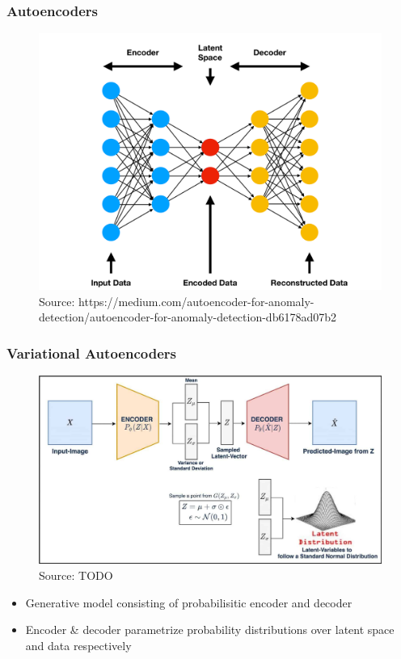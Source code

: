 \documentclass{beamer}
\theoremstyle{definition}
\begin{document}
    \begin{frame}
      \frametitle{Autoencoders}
      \begin{figure}
        \includegraphics[scale= 0.09]{Autoencoder_illustration.png}
        \caption*{Source: https://medium.com/autoencoder-for-anomaly-detection/autoencoder-for-anomaly-detection-db6178ad07b2}
      \end{figure}
    \end{frame}
    \begin{frame}
      \frametitle{Variational Autoencoders}
      \begin{figure}
        \includegraphics[scale=.125]{vae-diagram.jpg}
        \caption{Source: TODO}
      \end{figure}
      \vspace{-5mm}
      \begin{itemize}
        \item Generative model consisting of probabilisitic encoder and decoder
        \item Encoder \& decoder parametrize probability distributions over latent space and data respectively
      \end{itemize}

    \end{frame}
\end{document}
